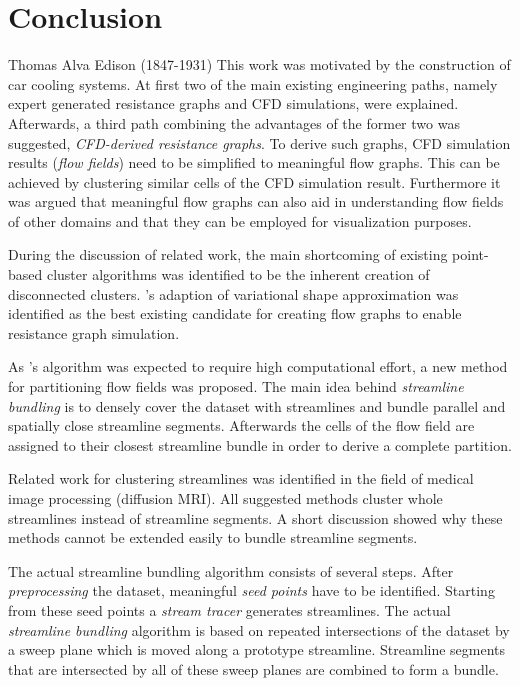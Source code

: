 

\chapter{Conclusion}\label{chp:future}

{Thomas Alva Edison (1847-1931)}
This work was motivated by the construction of car cooling systems. At first two of the main existing engineering paths, namely expert generated resistance graphs and \ac{CFD} simulations, were explained. Afterwards, a third path combining the advantages of the former two was suggested, \emph{\ac{CFD}-derived resistance graphs}. To derive such graphs, \ac{CFD} simulation results (\emph{flow fields}) need to be simplified to meaningful flow graphs. This can be achieved by clustering similar cells of the \ac{CFD} simulation result. Furthermore it was argued that meaningful flow graphs can also aid in understanding flow fields of other domains and that they can be employed for visualization purposes.

During the discussion of related work, the main shortcoming of existing point-based cluster algorithms was identified to be the inherent creation of disconnected clusters. 's adaption of variational shape approximation was identified as the best existing candidate for creating flow graphs to enable resistance graph simulation.

As 's algorithm was expected to require high computational effort, a new method for partitioning flow fields was proposed. The main idea behind \emph{streamline bundling} is to densely cover the dataset with streamlines and bundle parallel and spatially close streamline segments. Afterwards the cells of the flow field are assigned to their closest streamline bundle in order to derive a complete partition.

Related work for clustering streamlines was identified in the field of medical image processing (diffusion \ac{MRI}). All suggested methods cluster whole streamlines instead of streamline segments. A short discussion showed why these methods cannot be extended easily to bundle streamline segments.

The actual streamline bundling algorithm consists of several steps. After \emph{preprocessing} the dataset, meaningful \emph{seed points} have to be identified. Starting from these seed points a \emph{stream tracer} generates streamlines. The actual \emph{streamline bundling} algorithm is based on repeated intersections of the dataset by a sweep plane which is moved along a prototype streamline. Streamline segments that are intersected by all of these sweep planes are combined to form a bundle.


